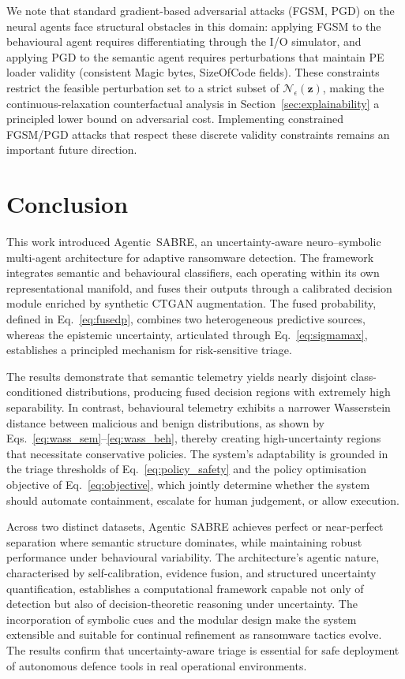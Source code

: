 \documentclass[3p]{elsarticle}
\begin{document}
We note that standard gradient-based adversarial attacks (FGSM, PGD) on the neural agents face structural obstacles in this domain: applying FGSM to the behavioural agent requires differentiating through the I/O simulator, and applying PGD to the semantic agent requires perturbations that maintain PE loader validity (consistent Magic bytes, SizeOfCode fields). These constraints restrict the feasible perturbation set to a strict subset of $\mathcal{N}_\epsilon(\mathbf{z})$, making the continuous-relaxation counterfactual analysis in Section~\ref{sec:explainability} a principled lower bound on adversarial cost. Implementing constrained FGSM/PGD attacks that respect these discrete validity constraints remains an important future direction.

\section{Conclusion}
\label{sec:conclusion}

This work introduced Agentic~SABRE, an uncertainty-aware neuro–symbolic multi-agent architecture for adaptive ransomware detection. The framework integrates semantic and behavioural classifiers, each operating within its own representational manifold, and fuses their outputs through a calibrated decision module enriched by synthetic CTGAN augmentation. The fused probability, defined in Eq.~\eqref{eq:fusedp}, combines two heterogeneous predictive sources, whereas the epistemic uncertainty, articulated through Eq.~\eqref{eq:sigmamax}, establishes a principled mechanism for risk-sensitive triage.

The results demonstrate that semantic telemetry yields nearly disjoint class-conditioned distributions, producing fused decision regions with extremely high separability. In contrast, behavioural telemetry exhibits a narrower Wasserstein distance between malicious and benign distributions, as shown by Eqs.~\eqref{eq:wass_sem}--\eqref{eq:wass_beh}, thereby creating high-uncertainty regions that necessitate conservative policies. The system’s adaptability is grounded in the triage thresholds of Eq.~\eqref{eq:policy_safety} and the policy optimisation objective of Eq.~\eqref{eq:objective}, which jointly determine whether the system should automate containment, escalate for human judgement, or allow execution.

Across two distinct datasets, Agentic~SABRE achieves perfect or near-perfect separation where semantic structure dominates, while maintaining robust performance under behavioural variability. The architecture's agentic nature, characterised by self-calibration, evidence fusion, and structured uncertainty quantification, establishes a computational framework capable not only of detection but also of decision-theoretic reasoning under uncertainty. The incorporation of symbolic cues and the modular design make the system extensible and suitable for continual refinement as ransomware tactics evolve. The results confirm that uncertainty-aware triage is essential for safe deployment of autonomous defence tools in real operational environments.
\end{document}
